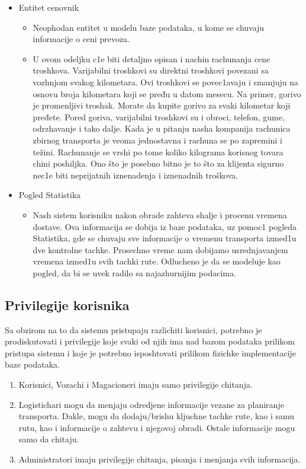 \begin{itemize}
\item Entitet cenovnik
    \begin{itemize}
        \item Neophodan entitet u modelu baze podataka, u kome se chuvaju informacije o ceni prevoza.
        \item U ovom odeljku c1e biti detaljno opisan i nachin rachunanja cene troshkova. 
        Varijabilni troshkovi su direktni troshkovi povezani sa vozhnjom svakog kilometara. Ovi troshkovi se povec1avaju i smanjuju na osnovu broja kilometara koji se pređu u datom mesecu. Na primer, gorivo je promenljivi troshak. Morate da kupite gorivo za svaki kilometar koji pređete. Pored goriva, varijabilni troshkovi su i obroci, telefon, gume, odrzhavanje i tako dalje.
Kada je u pitanju nasha kompanija rachunica zbirnog transporta je veoma jednostavna i rachuna se po zapremini i težini.
Rachunanje se vrshi po tome koliko kilograma korisnog tovara chini poshiljka.  
Ono što je posebno bitno je to što za klijenta sigurno nec1e biti 
 neprijatnih iznenadenja i iznenadnih troškova. 
    \end{itemize}
\item Pogled Statistika
    \begin{itemize}
        \item Nash sistem korisniku nakon obrade zahteva shalje i procenu vremena dostave. Ova informacija se dobija iz baze podataka, uz pomoc1 pogleda Statistika, gde se chuvaju sve informacije o vremenu transporta izmed1u dve kontrolne tachke. Prosechno vreme nam dobijamo usrednjavanjem vremena izmed1u svih tachki rute.
        Odlucheno je da se modeluje kao pogled, da bi se uvek radilo sa najazhurnijim podacima.

        
        
    \end{itemize}

\end{itemize}



\subsection{Privilegije korisnika}
Sa obzirom na to da sistemu pristupaju razlichiti korisnici, potrebno je prodiskutovati i privilegije koje svaki od njih ima nad bazom podataka prilikom pristupa sistemu i koje je potrebno isposhtovati prilikom fizichke implementacije baze podataka.

\begin{enumerate}
    \item Korisnici, Vozachi i Magacioneri imaju samo privilegije chitanja.
    \item Logistichari mogu da menjaju odredjene informacije vezane za planiranje transporta. Dakle, mogu da dodaju/brishu kljuchne tachke rute, kao i samu rutu, kao i informacije o zahtevu i njegovoj obradi. Ostale informacije mogu samo da chitaju.

    \item Administratori imaju privilegije chitanja, pisanja i menjanja svih informacija.

\end{enumerate}

